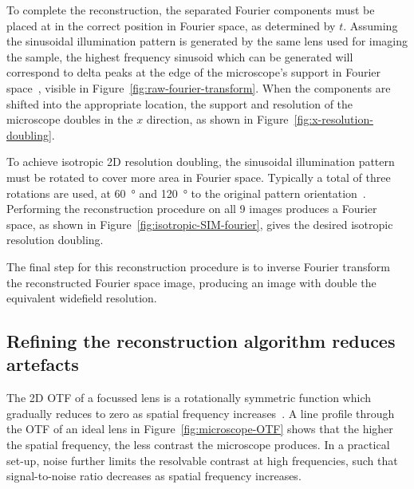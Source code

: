 To complete the reconstruction, the separated Fourier components must be placed at in the correct position in Fourier space, as determined by $t$. 
Assuming the sinusoidal illumination pattern is generated by the same lens used for imaging the sample, the highest frequency sinusoid which can be generated will correspond to delta peaks at the edge of the microscope's support in Fourier space~\cite{heintzmann2017super}, visible in Figure~\ref{fig:raw-fourier-transform}. 
When the components are shifted into the appropriate location, the support and resolution of the microscope doubles in the $x$ direction, as shown in Figure~\ref{fig:x-resolution-doubling}. 

To achieve isotropic 2D resolution doubling, the sinusoidal illumination pattern must be rotated to cover more area in Fourier space. 
Typically a total of three rotations are used, at \SI{60}{\degree} and \SI{120}{\degree} to the original pattern orientation~\cite{gustafsson2000surpassing, chang2009isotropic}. 
Performing the reconstruction procedure on all 9 images produces a Fourier space, as shown in Figure~\ref{fig:isotropic-SIM-fourier}, gives the desired isotropic resolution doubling. 

The final step for this reconstruction procedure is to inverse Fourier transform the reconstructed Fourier space image, producing an image with double the equivalent widefield resolution. 


\subsection{Refining the reconstruction algorithm reduces artefacts}
The 2D OTF of a focussed lens is a rotationally symmetric function which gradually reduces to zero as spatial frequency increases~\cite{williams2002introduction}. 
A line profile through the OTF of an ideal lens in Figure~\ref{fig:microscope-OTF} shows that the higher the spatial frequency, the less contrast the microscope produces.
In a practical set-up, noise further limits the resolvable contrast at high frequencies, such that signal-to-noise ratio decreases as spatial frequency increases. 

